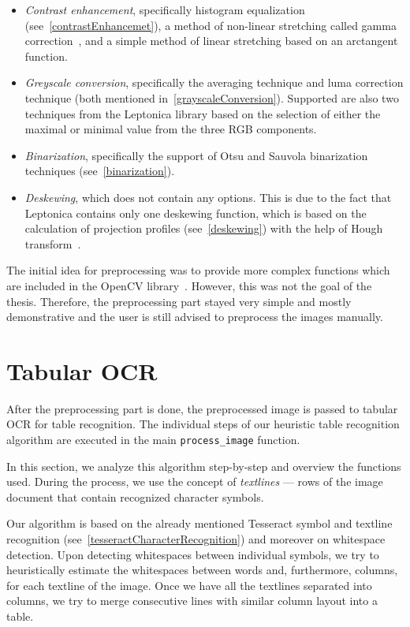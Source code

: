 \begin{itemize}
    \item \emph{Contrast enhancement}, specifically histogram equalization (see~\cref{contrastEnhancemet}), a method of non-linear stretching called gamma correction~\cite{rahman2016adaptive}, and a simple method of linear stretching based on an arctangent function.
    \item \emph{Greyscale conversion}, specifically the averaging technique and luma correction technique (both mentioned in~\cref{grayscaleConversion}). Supported are also two techniques from the Leptonica library based on the selection of either the maximal or minimal value from the three RGB components.
    \item \emph{Binarization}, specifically the support of Otsu and Sauvola binarization techniques (see~\cref{binarization}).
    \item \emph{Deskewing}, which does not contain any options. This is due to the fact that Leptonica contains only one deskewing function, which is based on the calculation of projection profiles (see~\cref{deskewing}) with the help of Hough transform~\cite{bloomberg2analysis}.
\end{itemize}

The initial idea for preprocessing was to provide more complex functions which are included in the OpenCV library~\cite{OpenCV}. However, this was not the goal of the thesis. Therefore, the preprocessing part stayed very simple and mostly demonstrative and the user is still advised to preprocess the images manually.

\section{Tabular OCR}

After the preprocessing part is done, the preprocessed image is passed to tabular OCR for table recognition. The individual steps of our heuristic table recognition algorithm are executed in the main \texttt{process\_image} function.

In this section, we analyze this algorithm step-by-step and overview the functions used. During the process, we use the concept of \emph{textlines} --- rows of the image document that contain recognized character symbols.

Our algorithm is based on the already mentioned Tesseract symbol and textline recognition (see~\cref{tesseractCharacterRecognition}) and moreover on whitespace detection. Upon detecting whitespaces between individual symbols, we try to heuristically estimate the whitespaces between words and, furthermore, columns, for each textline of the image. Once we have all the textlines separated into columns, we try to merge consecutive lines with similar column layout into a table.  

